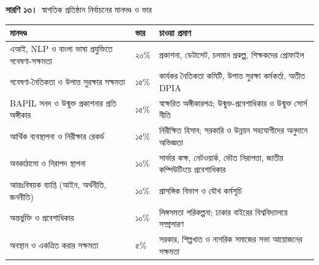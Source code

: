 \documentclass[border=10pt]{standalone}
\begin{document}
\begin{minipage}{17cm}
{\large\bfseries সারণি ১৩।}\ {\large স্বাগতিক প্রতিষ্ঠান নির্বাচনের মানদণ্ড ও ভার}\par\vspace{7pt}
\small
{}
\begin{tabularx}{\linewidth}{@{}>{\hsize=1.297\hsize\raggedright\arraybackslash}X>{\hsize=0.324\hsize\raggedright\arraybackslash}X>{\hsize=1.378\hsize\raggedright\arraybackslash}X@{}}
\arrayrulecolor{bapilrule}\toprule
\rowcolor{white}\textbf{মানদণ্ড} & \textbf{ভার} & \textbf{চাওয়া প্রমাণ} \\
\midrule
এআই, NLP ও বাংলা ভাষা প্রযুক্তিতে গবেষণা-সক্ষমতা & ২০\% & প্রকাশনা, ডেটাসেট, চলমান প্রকল্প, শিক্ষকদের প্রোফাইল \\
গবেষণা-নৈতিকতা ও উপাত্ত সুরক্ষার সক্ষমতা & ১৫\% & কার্যকর নৈতিকতা কমিটি, উপাত্ত সুরক্ষা কর্মকর্তা, অতীত DPIA \\
BAPIL সনদ ও উন্মুক্ত প্রকাশনার প্রতি অঙ্গীকার & ১৫\% & স্বাক্ষরিত অঙ্গীকারপত্র; উন্মুক্ত-প্রবেশাধিকার ও উন্মুক্ত সোর্স নীতি \\
আর্থিক ব্যবস্থাপনা ও নিরীক্ষার রেকর্ড & ১৫\% & নিরীক্ষিত হিসাব; সরকারি ও উন্নয়ন সহযোগীদের অনুদানে অভিজ্ঞতা \\
অবকাঠামো ও নিরাপদ স্থাপনা & ১০\% & সার্ভার কক্ষ, নেটওয়ার্ক, ভৌত নিরাপত্তা, জাতীয় কম্পিউটিংয়ে প্রবেশাধিকার \\
আন্তঃবিষয়ক ব্যাপ্তি (আইন, অর্থনীতি, জননীতি) & ১০\% & প্রাসঙ্গিক বিভাগ ও যৌথ কর্মসূচি \\
অন্তর্ভুক্তি ও প্রবেশাধিকার & ১০\% & লিঙ্গসমতা পরিকল্পনা; ঢাকার বাইরের বিশ্ববিদ্যালয়ে সম্প্রসারণ \\
অবস্থান ও একত্রিত করার সক্ষমতা & ৫\% & সরকার, শিল্পখাত ও নাগরিক সমাজের সভা আয়োজনের সক্ষমতা \\
\bottomrule
\end{tabularx}
\par\vspace{5pt}{\footnotesize\itshape একটি স্বাধীন প্যানেল স্কোর দেয়; স্টিয়ারিং বোর্ড ফলাফল নিশ্চিত করে। আহ্বান প্রকাশের আগে ভার সমন্বয় করা যেতে পারে।}
\par{}
\end{minipage}
\end{document}
